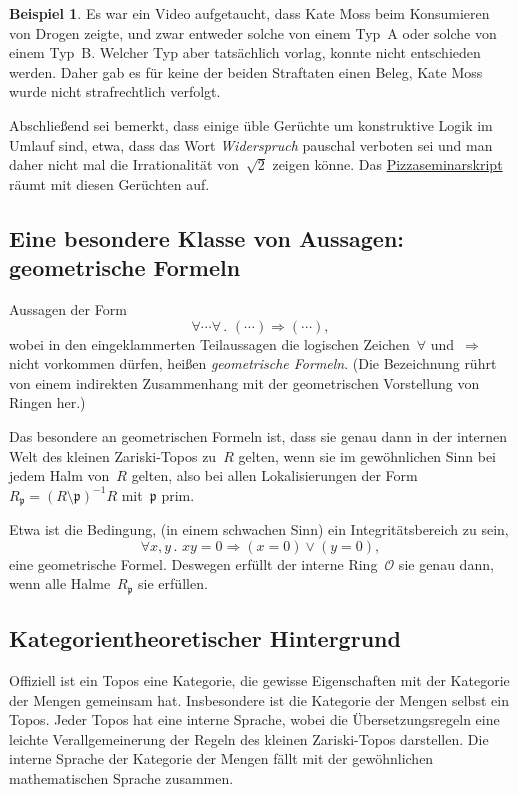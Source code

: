 \documentclass[a4paper,ngerman,12pt]{scrartcl}
\theoremstyle{definition}
\newtheorem{bsp}[defn]{Beispiel}
\theoremstyle{plain}
\theoremstyle{remark}
\newcommand{\pp}{\mathfrak{p}}
\renewcommand{\O}{\mathcal{O}}
\renewcommand{\_}{\mathpunct{.}\,}
\newcommand{\?}{\,{:}\,}
\begin{document}
\begin{bsp}
Es war ein Video aufgetaucht, dass Kate Moss beim Konsumieren von Drogen zeigte,
und zwar entweder solche von einem Typ~A oder solche von einem Typ~B. Welcher
Typ aber tatsächlich vorlag, konnte nicht entschieden werden. Daher gab es für
keine der beiden Straftaten einen Beleg, Kate Moss wurde nicht
strafrechtlich verfolgt.
\end{bsp}

Abschließend sei bemerkt, dass einige üble Gerüchte um konstruktive Logik im
Umlauf sind, etwa, dass das Wort \!\emph{Widerspruch} pauschal verboten sei und
man daher nicht mal die Irrationalität von~$\sqrt{2}$ zeigen könne. Das
\href{http://pizzaseminar.speicherleck.de/skript2/konstruktive-mathematik.pdf}{Pizzaseminarskript} räumt mit diesen Gerüchten auf.


\subsection*{Eine besondere Klasse von Aussagen: geometrische Formeln}

Aussagen der Form
\[ \forall \cdots \forall\_ (\cdots) \Rightarrow (\cdots), \]
wobei in den eingeklammerten Teilaussagen die logischen Zeichen~$\forall$
und~$\Rightarrow$ nicht vorkommen dürfen, heißen \emph{geometrische Formeln}.
(Die Bezeichnung rührt von einem indirekten Zusammenhang mit der geometrischen
Vorstellung von Ringen her.)

Das besondere an geometrischen Formeln ist, dass sie genau dann in der internen
Welt des kleinen Zariski-Topos zu~$R$ gelten, wenn sie im gewöhnlichen Sinn bei
jedem Halm von~$R$ gelten, also bei allen Lokalisierungen der Form~$R_\pp = (R
\setminus \pp)^{-1}R$ mit~$\pp$ prim.

Etwa ist die Bedingung, (in einem schwachen Sinn) ein Integritätsbereich zu
sein,
\[ \forall x,y\_ xy = 0 \Rightarrow (x = 0) \vee (y = 0), \]
eine geometrische Formel. Deswegen erfüllt der interne Ring~$\O$ sie genau
dann, wenn alle Halme~$R_\pp$ sie erfüllen.



\subsection*{Kategorientheoretischer Hintergrund}

Offiziell ist ein Topos eine Kategorie, die gewisse Eigenschaften mit der
Kategorie der Mengen gemeinsam hat. Insbesondere ist die Kategorie der Mengen
selbst ein Topos. Jeder Topos hat eine interne Sprache, wobei die
Übersetzungsregeln eine leichte Verallgemeinerung der Regeln des kleinen
Zariski-Topos darstellen. Die interne Sprache der Kategorie der Mengen fällt
mit der gewöhnlichen mathematischen Sprache zusammen.
\end{document}
